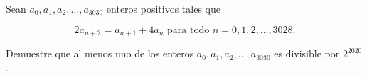 Sean $a_0, a_1, a_2, \dots , a_{3030}$ enteros positivos tales que

\[2a_{n + 2} = a_{n + 1} + 4a_n \text{ para todo } n = 0, 1, 2, \ldots, 3028.\]

Demuestre que al menos uno de los enteros $a_0, a_1, a_2, \dots , a_{3030}$ es divisible por $2^{2020}$.
